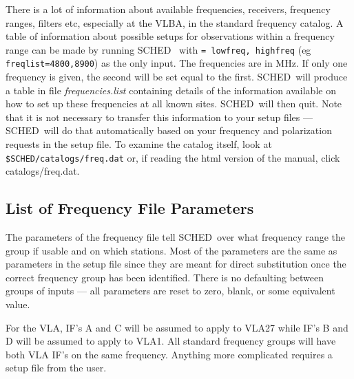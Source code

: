 \documentclass{report}
\newcommand{\schedb}{{\sc SCHED~}}
\begin{document}
There is a lot of information about available frequencies, receivers,
frequency ranges, filters etc, especially at the VLBA, in the standard
frequency catalog.  A table of information about possible setups for
observations within a frequency range can be made by running \schedb
with  {\tt = lowfreq, highfreq}
(eg {\tt freqlist=4800,8900}) as the only input.  The frequencies are
in MHz.  If only one frequency is given, the second will be set equal
to the first.  \schedb will produce a table in file {\sl
frequencies.list} containing details of the information available on
how to set up these frequencies at all known sites.  \schedb will then
quit.  Note that it is not necessary to transfer this information to
your setup files --- \schedb will do that automatically based on your
frequency and polarization requests in the setup file.  To examine the
catalog itself, look at {\tt \$SCHED/catalogs/freq.dat} or, if reading
the html version of the manual, click 
{catalogs/freq.dat}.


\subsection{\label{SSEC:FREQLST}List of Frequency File Parameters}

The parameters of the frequency file tell \schedb over what frequency
range the group if usable and on which stations.  Most of the parameters
are the same as parameters in the setup file since they are meant
for direct substitution once the correct frequency group has been
identified.  There is no defaulting between groups of inputs --- all
parameters are reset to zero, blank, or some equivalent value.

For the VLA, IF's A and C will be assumed to apply to VLA27 while
IF's B and D will be assumed to apply to VLA1.  All standard
frequency groups will have both VLA IF's on the same frequency.
Anything more complicated requires a setup file from the user.
\end{document}
